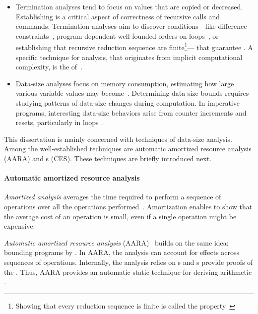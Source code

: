 \begin{itemize}
\item Termination analyses tend to focus on values that are copied or decreased.
    Establishing  is a critical aspect of correctness of
    recursive calls and commands. Termination analyses aim to discover
    conditions---like difference constraints~\cite{sinn2017}, program-dependent
    well-founded orders on loops~\cite{lee2001}, or establishing that recursive
    reduction sequence are finite\footnote{Showing that every reduction
    sequence is finite is called the \emph{}
    property~\cite[p. 36]{bertot2004}}--- that guarantee . A
    specific technique for  analysis, that originates from
    implicit computational complexity, is the  of~\textcite{lee2001}.
\item Data-size analyses focus on memory consumption, estimating how large
    various variable values may become~\cite{lommen2023}. Determining data-size
    bounds requires studying patterns of data-size changes during computation.
    In imperative programs, interesting data-size behaviors arise from counter
    increments and resets, particularly in loops~\cite{sinn2017,benamram2020}.
\end{itemize}

This dissertation is mainly concerned with techniques of data-size analysis.
Among the well-established techniques are automatic amortized resource
analysis (AARA) and s (CES).
These techniques are briefly introduced next.

\paragraph*{Automatic amortized resource analysis}
\emph{Amortized analysis} averages the time required
to perform a sequence of operations over all the operations performed~\cite[p.
451]{cormen2009}. Amortization enables to show that the
average cost of an operation is small, even if a single operation might be
expensive.

\emph{Automatic amortized resource analysis}
(AARA)~\cite{hoffmann2022} builds
on the same idea: bounding programs by . In AARA, the analysis
can account for  effects across sequences of operations.
Internally, the analysis relies on s and s provide proofs of the . Thus, AARA provides an
automatic static technique for deriving arithmetic .

